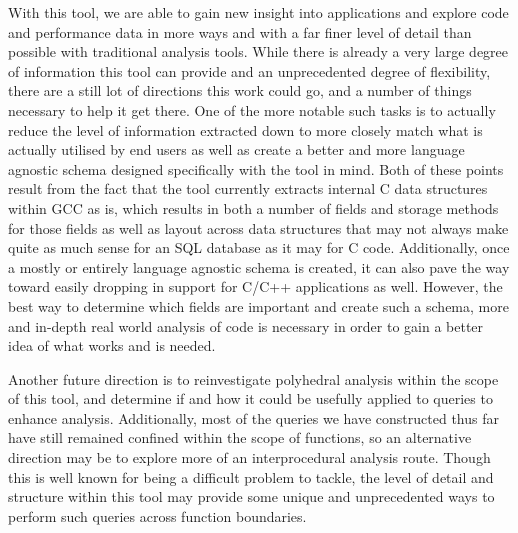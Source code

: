 With this tool, we are able to gain new insight into applications and explore code and performance data in more ways and with a far finer level of detail than possible with traditional analysis tools.
While there is already a very large degree of information this tool can provide and an unprecedented degree of flexibility, there are a still lot of directions this work could go, and a number of things necessary to help it get there.
One of the more notable such tasks is to actually reduce the level of information extracted down to more closely match what is actually utilised by end users as well as create a better and more language agnostic schema designed specifically with the tool in mind.
Both of these points result from the fact that the tool currently extracts internal C data structures within \acs{GCC} as is, which results in both a number of fields and storage methods for those fields as well as layout across data structures that may not always make quite as much sense for an \acs{SQL} database as it may for C code.
Additionally, once a mostly or entirely language agnostic schema is created, it can also pave the way toward easily dropping in support for C/C++ applications as well.
However, the best way to determine which fields are important and create such a schema, more and in-depth real world analysis of code is necessary in order to gain a better idea of what works and is needed.

Another future direction is to reinvestigate polyhedral analysis within the scope of this tool, and determine if and how it could be usefully applied to queries to enhance analysis.
Additionally, most of the queries we have constructed thus far have still remained confined within the scope of functions, so an alternative direction may be to explore more of an interprocedural analysis route.
Though this is well known for being a difficult problem to tackle, the level of detail and structure within this tool may provide some unique and unprecedented ways to perform such queries across function boundaries.
